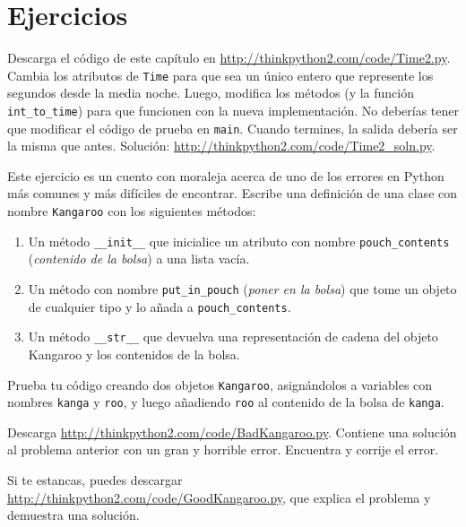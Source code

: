 \documentclass[10pt]{book}
\begin{document}
\section{Ejercicios}

\begin{exercise}

Descarga el código de este capítulo en
\url{http://thinkpython2.com/code/Time2.py}.  Cambia los atributos de
    {\tt Time} para que sea un único entero que represente los segundos desde
    la media noche.  Luego, modifica los métodos (y la función
    \verb"int_to_time") para que funcionen con la nueva implementación.  No
    deberías tener que modificar el código de prueba en {\tt main}.  Cuando
    termines, la salida debería ser la misma que antes.  Solución:
    \url{http://thinkpython2.com/code/Time2_soln.py}.

\end{exercise}


\begin{exercise}
\label{kangaroo}

Este ejercicio es un cuento con moraleja acerca de uno de los errores
en Python más comunes y más difíciles de encontrar.
Escribe una definición de una clase con nombre {\tt Kangaroo} con los siguientes
métodos:

\begin{enumerate}

\item Un método \verb"__init__" que inicialice un atributo con nombre
\verb"pouch_contents" ({\em contenido de la bolsa}) a una lista vacía.

\item Un método con nombre \verb"put_in_pouch" ({\em poner en la bolsa}) que tome un objeto
de cualquier tipo y lo añada a \verb"pouch_contents".

\item Un método \verb"__str__" que devuelva una representación de cadena
del objeto Kangaroo y los contenidos de la bolsa.

\end{enumerate}
%
Prueba tu código
creando dos objetos {\tt Kangaroo}, asignándolos a variables
con nombres {\tt kanga} y {\tt roo}, y luego añadiendo {\tt roo} al
contenido de la bolsa de {\tt kanga}.

Descarga \url{http://thinkpython2.com/code/BadKangaroo.py}.  Contiene
una solución al problema anterior con un gran y horrible error.
Encuentra y corrije el error.

Si te estancas, puedes descargar
\url{http://thinkpython2.com/code/GoodKangaroo.py}, que explica el
problema y demuestra una solución.

\end{exercise}
\end{document}
